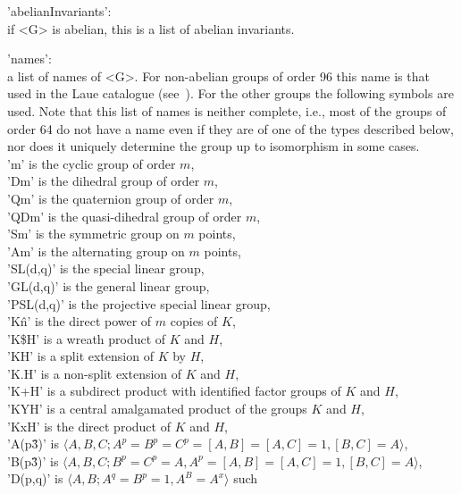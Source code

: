 'abelianInvariants': \\
    if <G> is abelian,  this is a list of abelian invariants.

'names': \\
    a list of names of <G>.  For non-abelian groups of order 96 this name
    is that used in the Laue catalogue (see~\cite{Lau82}).  For the other
    groups the following symbols  are used. Note that  this list of names
    is neither complete, i.e., most of the groups of order 64 do not have
    a name even if they are of one of the types described below, nor does
    it uniquely determine the group up to isomorphism in some cases.
    \medskip\\
%
    'm' is the cyclic group of order $m$, \\
    'Dm' is the dihedral group of order $m$, \\
    'Qm' is the quaternion group of order $m$, \\
    'QDm' is the quasi-dihedral group of order $m$, \\
    'Sm' is the symmetric group on $m$ points, \\
    'Am' is the alternating group on $m$ points, \\
    'SL(d,q)' is the special linear group, \\
    'GL(d,q)' is the general linear group, \\
    'PSL(d,q)' is the projective special linear group, \\
    'K\^n' is the direct power of $m$ copies of $K$, \\
    'K\$H' is a wreath product of $K$ and $H$, \\
    'K\:H' is a split extension of $K$ by $H$, \\
    'K.H' is a non-split extension of $K$ and $H$, \\
    'K+H' is a subdirect product with identified factor groups of $K$ 
          and $H$, \\
    'KYH' is a central amalgamated product of the groups $K$ and $H$, \\
    'KxH' is the direct product of $K$ and $H$, \smallskip\\
    'A(p\^3)' is $\langle A, B, C ; A^p = B^p = C^p = [A,B] = [A,C] = 1,
    [B,C] = A \rangle$, \smallskip\\
    'B(p\^3)' is $\langle A, B, C ; B^p = C^p = A, A^p = [A,B] = [A,C] =
    1, [B,C] = A \rangle$, \smallskip\\
    'D(p,q)' is $\langle A, B ; A^q = B^p = 1, A^B = A^x \rangle$ such
